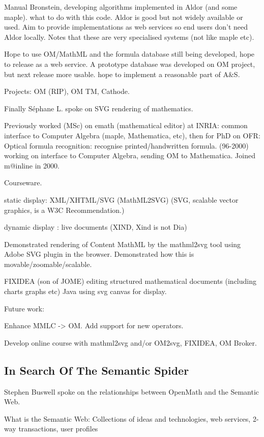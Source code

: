 \documentclass[11pt, a4paper]{article}
\begin{document}
Manual Bronstein, developing algorithms implemented in Aldor (and some maple).
what to do with this code. Aldor is good but not widely available or used.
Aim to provide implementations as web services so end users don't need Aldor
locally. Notes that these are very specialised systems (not like maple etc).

Hope to use OM/MathML and the formula database still being developed,
hope to release as a web service.
A prototype database was developed on OM project, but next release more usable.
hope to implement a reasonable part of A\&S.

Projects: OM (RIP), OM TM, Cathode.

Finally S\'ephane L. spoke on SVG rendering of mathematics.

Previously worked (MSc) on emath (mathematical editor) at INRIA: common
interface to Computer Algebra (maple, Mathematica, etc), then for PhD on OFR: Optical
formula recognition: recognise printed/handwritten
formula. (96-2000) working on interface to Computer Algebra, sending OM to Mathematica.
Joined m@inline in 2000.

Courseware.

static display: XML/XHTML/SVG (MathML2SVG) (SVG, scalable vector
graphics, is a  W3C Recommendation.)

dynamic display : live documents (XIND, Xind is not Dia)


Demonstrated rendering of Content MathML by the mathml2svg tool using
Adobe SVG plugin in the browser. Demonstrated how this is
movable/zoomable/scalable.


FIXIDEA (son of JOME) 
editing structured mathematical documents (including charts graphs etc)
Java using svg canvas for display.

Future work:

Enhance MMLC -> OM. Add support for new operators.

Develop online course with
mathml2svg and/or OM2svg, FIXIDEA, OM Broker.



\subsection{In Search Of The Semantic Spider}
Stephen Buswell spoke on the relationships between OpenMath and the
Semantic Web.

What is the Semantic Web:
Collections of ideas and technologies, web services, 2-way
transactions, user profiles
\end{document}
